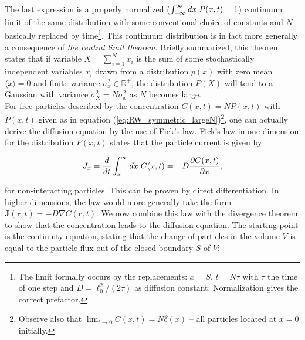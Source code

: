 \documentclass[a4paper, 11pt, notitlepage,english]{article}
\begin{document}
The last expression is a properly normalized ($\int_{-\infty}^{\infty} dx \hspace{1mm} P(x,t) =1 $) continuum limit of the same distribution with some conventional choice of 
constants and $N$ basically replaced by time\footnote{The limit formally occurs by the replacements: $x = S$, $t = N\tau$ with $\tau$ the time of one step and 
$D = \ell_0^2/(2\tau)$ as diffusion constant. Normalization gives the correct prefactor.}. This continuum distribution is in fact more generally a consequence of 
\emph{the central limit theorem}. Briefly summarized, this theorem states that if variable $X = \sum_{i=1}^N x_i$ is the sum of some stochastically independent 
variables $x_i$ drawn from a distribution $p(x)$ with zero mean $\langle x \rangle = 0$ and finite variance $\sigma_x^2 \in \mathbb{R}^+$, the distribution $P(X)$ 
will tend to a Gaussian with variance $\sigma_X^2 = N\sigma_x^2$ as $N$ becomes large. \\

For free particles described by the concentration
$C(x,t) = NP(x,t)$ with $P(x,t)$ given as in equation (\ref{eq:RW_symmetric_largeN})\footnote{Observe also that $\lim_{t\to 0}C(x,t) = N\delta(x)$ – all particles located at $x=0$ initially.}, one can actually derive the diffusion equation by the use of Fick's law. 
Fick's law in one dimension for the distribution $P(x,t)$ states that the particle current is given by 

\begin{equation}
J_x = \frac{d}{dt} \int_x^{\infty} dx \hspace{1mm} C(x,t) = -D \frac{\partial C(x,t)}{\partial x},
\label{eq:Fick_law}
\end{equation}

for non-interacting particles.
This can be proven by direct differentiation. In higher dimensions, the law would more generally take the form 
$\boldsymbol{J}(\boldsymbol{r},t) = - D \nabla C(\boldsymbol{r},t)$. We now combine this law with the divergence theorem to show that the concentration leads to the diffusion equation. The starting point is the continuity equation, stating that the change of particles in the volume $V$ is equal to the particle flux out of the closed boundary $S$ of $V$:
\end{document}

